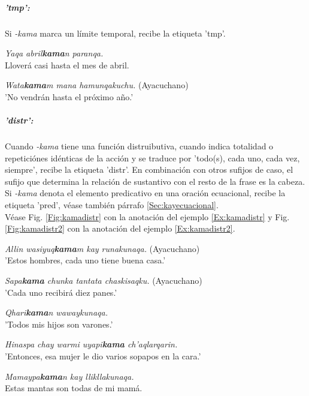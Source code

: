 \documentclass[a4paper,11pt,DIV12]{scrartcl}
\begin{document}
\subparagraph{'tmp':}
Si {\em -kama} marca un l\'imite temporal, recibe la etiqueta 'tmp'.

\begin{examples}
 \item {\em Yaqa abril\textbf{kama}n paranqa.}\\
      Llover\'a casi hasta el mes de abril.\\
 	 \hfill{\small \citep[129]{Cusi2}}
 \item {\em Wata\textbf{kama}m mana hamunqakuchu.} (Ayacuchano)\\
	'No vendr\'an hasta el pr\'oximo a\~no.'\\
 	        \hfill{\small \citep[81]{Soto76a}}
\end{examples}


\subparagraph{'distr':}\label{Sec:kamadistr}
Cuando {\em -kama} tiene una funci\'on distruibutiva, cuando indica totalidad o repetici\'ones id\'enticas de la acci\'on y se traduce por 'todo(s), cada uno, cada vez, siempre', recibe la etiqueta 'distr'.
En combinaci\'on con otros sufijos de caso, el sufijo que determina la relaci\'on de sustantivo con el resto de la frase es la cabeza.\\
Si {\em -kama} denota el elemento predicativo en una oraci\'on ecuacional, recibe la etiqueta 'pred', v\'ease tambi\'en p\'arrafo \ref{Sec:kayecuacional}.\\
V\'ease Fig. \ref{Fig:kamadistr} con la anotaci\'on del ejemplo \ref{Ex:kamadistr} y Fig. \ref{Fig:kamadistr2} con la anotaci\'on del ejemplo \ref{Ex:kamadistr2}.


\begin{examples}

 \item {\em Allin wasiyuq\textbf{kama}m kay runakunaqa.} (Ayacuchano)\\
      'Estos hombres, cada uno tiene buena casa.'\\
	        \hfill{\small \citep[81]{Soto76a}}

 \item {\em Sapa\textbf{kama} chunka tantata chaskisaqku.} (Ayacuchano)\\
      'Cada uno recibir\'a diez panes.'\\
          \hfill{\small \citep[381]{Soto06}}

  \item\label{Ex:kamadistr} {\em Qhari\textbf{kama}n wawaykunaqa.}\\
	'Todos mis hijos son varones.'
 
  \item\label{Ex:kamadistr2} {\em Hinaspa chay warmi uyapi\textbf{kama} ch'aqlarqarin.}\\
	'Entonces, esa mujer le dio varios sopapos en la cara.'

  \item {\em Mamaypa\textbf{kama}n kay llikllakunaqa.}\\
	Estas mantas son todas de mi mam\'a.\\
  	 \hfill{\small \citep[130]{Cusi2}}
\end{examples}
\end{document}
